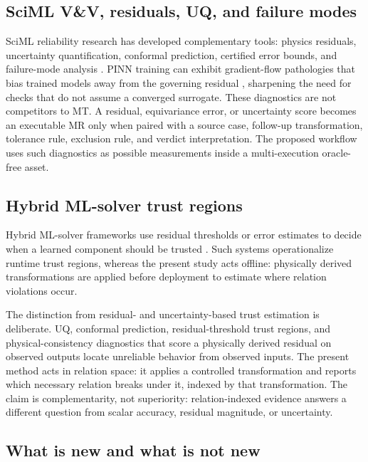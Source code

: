 \documentclass[preprint,12pt]{elsarticle}
\begin{document}
\subsection{SciML V\&V, residuals, UQ, and failure modes}
\label{subsec:sciml-vv}

SciML reliability research has developed complementary tools: physics residuals, uncertainty quantification, conformal prediction, certified error bounds, and failure-mode analysis \citep{raissi2019pinn,karniadakis2021piml,li2021fno,krishnapriyan2021failure,gopakumar2025calibrated}. PINN training can exhibit gradient-flow pathologies that bias trained models away from the governing residual \citep{wang2021gradflow,krishnapriyan2021failure}, sharpening the need for checks that do not assume a converged surrogate. These diagnostics are not competitors to MT. A residual, equivariance error, or uncertainty score becomes an executable MR only when paired with a source case, follow-up transformation, tolerance rule, exclusion rule, and verdict interpretation. The proposed workflow uses such diagnostics as possible measurements inside a multi-execution oracle-free asset.

\subsection{Hybrid ML-solver trust regions}
\label{subsec:hybrid-trust}

Hybrid ML-solver frameworks use residual thresholds or error estimates to decide when a learned component should be trusted \citep{baral2025xrepit,wang2025deeponetfe}. Such systems operationalize runtime trust regions, whereas the present study acts offline: physically derived transformations are applied before deployment to estimate where relation violations occur.

The distinction from residual- and uncertainty-based trust estimation is deliberate. UQ, conformal prediction, residual-threshold trust regions, and physical-consistency diagnostics that score a physically derived residual on observed outputs \citep{najafi2026} locate unreliable behavior from observed inputs. The present method acts in relation space: it applies a controlled transformation and reports which necessary relation breaks under it, indexed by that transformation. The claim is complementarity, not superiority: relation-indexed evidence answers a different question from scalar accuracy, residual magnitude, or uncertainty.

\subsection{What is new and what is not new}
\label{subsec:new-not-new}
\end{document}
